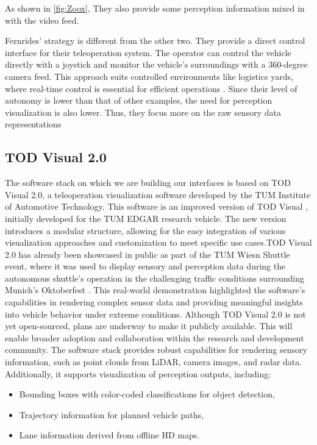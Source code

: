 As shown in \ref{fig:Zoox}, They also provide some perception information mixed in with the video feed.

Fernrides' strategy is different from the other two. They provide a direct
control interface for their teleoperation system. The operator can control the vehicle directly with a joystick and monitor the vehicle's surroundings with a 360-degree camera feed. This approach suits controlled environments like logistics yards, where real-time control is essential for efficient operations \cite{fernride2023}. Since their level of autonomy is lower than that of other examples, the need for perception visualization is also lower. Thus, they focus more on the raw sensory data representations

\subsection{TOD Visual 2.0}\label{subsection:todvisual}
The software stack on which we are building our interfaces is based on TOD Visual 2.0, a teleoperation visualization software developed by the TUM Institute of Automotive Technology. This software is an improved version of TOD Visual \cite{Schimpe}, initially developed for the TUM EDGAR research vehicle. The new version introduces a modular structure, allowing for the easy integration of various visualization approaches and customization to meet specific use cases.TOD Visual 2.0 has already been showcased in public as part of the TUM Wiesn Shuttle event, where it was used to display sensory and perception data during the autonomous shuttle's operation in the challenging traffic conditions surrounding Munich's Oktoberfest \cite{adac2024wiesn, tum2024wiesn}. This real-world demonstration highlighted the software's capabilities in rendering complex sensor data and providing meaningful insights into vehicle behavior under extreme conditions. Although TOD Visual 2.0 is not yet open-sourced, plans are underway to make it publicly available. This will enable broader adoption and collaboration within the research and development community. The software stack provides robust capabilities for rendering sensory information, such as point clouds from LiDAR, camera images, and radar data. Additionally, it supports visualization of perception outputs, including:
\begin{itemize}
    \item Bounding boxes with color-coded classifications for object detection,
    \item Trajectory information for planned vehicle paths,
    \item Lane information derived from offline HD maps.
\end{itemize}

